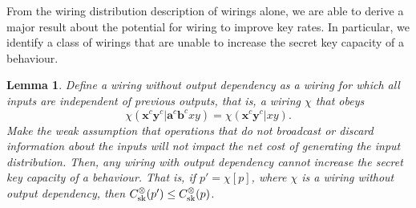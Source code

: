 \documentclass[10pt, a4paper]{article}
\numberwithin{equation}{section} %
\newcounter{stmt} %
\theoremstyle{definition}
\theoremstyle{plain}
\newtheorem{lemma}[stmt]{Lemma}
\newcommand{\?}{\mathrel{?}} %
\newcommand{\cvec}[1]{\boldsymbol{\mathbf{#1}}}    %
\newcommand{\sk}{\rm sk}
\begin{document}
                  From the wiring distribution description of wirings alone, we are able to derive a major result about the potential for wiring to improve key rates. In particular, we identify a class of wirings that are unable to increase the secret key capacity of a behaviour.
              \begin{lemma}\label{thm:outdep}
                Define a \emph{wiring without output dependency} as a wiring for which all inputs are independent of previous outputs, that is, a wiring \(\chi\) that obeys
                \begin{equation}\label{eqn:nooutputdep}
                  \chi(\cvec{x}^c\cvec{y}^c|\cvec{a}^c\cvec{b}^cxy) = \chi(\cvec{x}^c\cvec{y}^c|xy).
                \end{equation}
                Make the weak assumption that operations that do not broadcast or discard information about the inputs will not impact the net cost of generating the input distribution. Then, any wiring with output dependency cannot increase the secret key capacity of a behaviour. That is, if \(p' = \chi[p]\), where \(\chi\) is a wiring without output dependency, then \(C_{\sk}^{\otimes}(p') \leq C_{\sk}^{\otimes}(p)\).
              \end{lemma}
\end{document}

